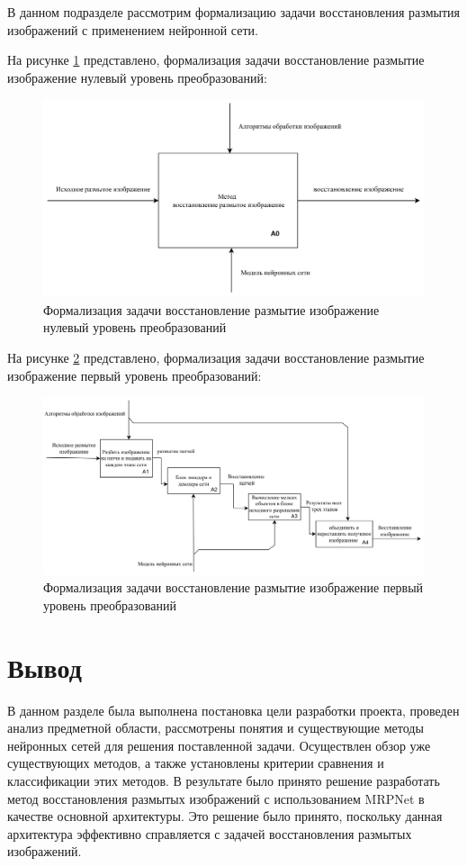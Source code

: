 В данном подразделе рассмотрим формализацию задачи восстановления размытия изображений с применением нейронной сети.

На рисунке \ref{fig:method-desc-a0} представлено, формализация задачи восстановление размытие изображение нулевый уровень преобразований:
\begin{figure}[H]
	\centering
	\includegraphics[width=1\linewidth]{assets/idef0-A0.png}
	\caption{Формализация задачи восстановление размытие изображение нулевый уровень преобразований}
	\label{fig:method-desc-a0}
\end{figure}


На рисунке \ref{fig:method-desc-a1} представлено, формализация задачи восстановление размытие изображение первый уровень преобразований:
\begin{figure}[H]
	\centering
	\includegraphics[width=1\linewidth]{assets/idef0-A1.png}
	\caption{Формализация задачи восстановление размытие изображение первый уровень преобразований}
	\label{fig:method-desc-a1}
\end{figure}

\section*{Вывод}

В данном разделе была выполнена постановка цели разработки проекта, проведен анализ предметной области, рассмотрены понятия и существующие методы нейронных сетей для решения поставленной задачи. Осуществлен обзор уже существующих методов, а также установлены критерии сравнения и классификации этих методов. В результате было принято решение разработать метод восстановления размытых изображений с использованием MRPNet в качестве основной архитектуры. Это решение было принято, поскольку данная архитектура эффективно справляется с задачей восстановления размытых изображений.